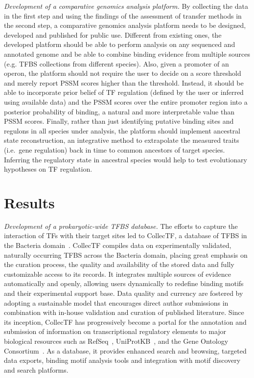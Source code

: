 \textit{Development of a comparative genomics analysis platform.}  By
collecting the data in the first step and using the findings of the assessment
of transfer methods in the second step, a comparative genomics analysis
platform needs to be designed, developed and published for public
use. Different from existing ones, the developed platform should be able to
perform analysis on any sequenced and annotated genome and be able to combine
binding evidence from multiple sources (e.g. TFBS collections from different
species). Also, given a promoter of an operon, the platform should not require
the user to decide on a score threshold and merely report PSSM scores higher
than the threshold. Instead, it should be able to incorporate prior belief of
TF regulation (defined by the user or inferred using available data) and the
PSSM scores over the entire promoter region into a posterior probability of
binding, a natural and more interpretable value than PSSM scores. Finally,
rather than just identifying putative binding sites and regulons in all species
under analysis, the platform should implement ancestral state reconstruction,
an integrative method to extrapolate the measured traits (i.e.\ gene
regulation) back in time to common ancestors of target species. Inferring the
regulatory state in ancestral species would help to test evolutionary
hypotheses on TF regulation.

\section{Results}

\textit{Development of a prokaryotic-wide TFBS database.}  The efforts to
capture the interaction of TFs with their target sites led to CollecTF, a
database of TFBS in the Bacteria domain~\cite{kilic2013collectf,
  kilicc2016data}. CollecTF compiles data on experimentally validated,
naturally occurring TFBS across the Bacteria domain, placing great emphasis on
the curation process, the quality and availability of the stored data and fully
customizable access to its records. It integrates multiple sources of evidence
automatically and openly, allowing users dynamically to redefine binding motifs
and their experimental support base. Data quality and currency are fostered by
adopting a sustainable model that encourages direct author submissions in
combination with in-house validation and curation of published
literature. Since its inception, CollecTF has progressively become a portal for
the annotation and submission of information on transcriptional regulatory
elements to major biological resources such as RefSeq~\cite{o2015reference},
UniProtKB~\cite{uniprot2014uniprot}, and the Gene Ontology
Consortium~\cite{gene2013gene}. As a database, it provides enhanced search and
browsing, targeted data exports, binding motif analysis tools and integration
with motif discovery and search platforms.

